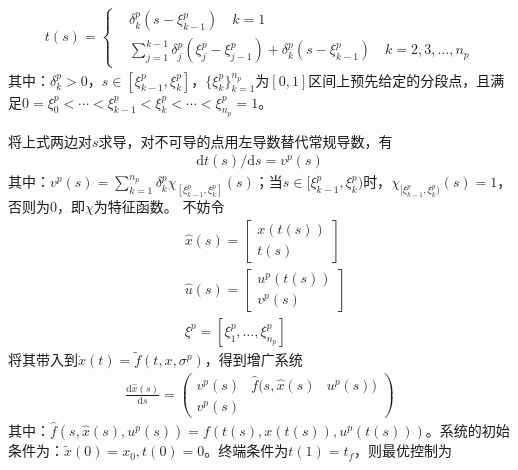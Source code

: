             \begin{align*}
            t(s) = \left\{
            \begin{aligned}
            & \delta_k^p(s-\xi_{k-1}^p)\quad k=1\\
            & \sum_{j=1}^{k-1}\delta_j^p(\xi_j^p - \xi_{j-1}^p)+\delta_k^p(s-\xi_{k-1}^p) \quad k=2,3,\dots,n_p
            \end{aligned}
            \right.
            \end{align*}
            其中：$\delta_k^p >0$，$s\in [\xi_{k-1}^p,\xi_k^p]$，$\{\xi_k^p\}_{k=1}^{n_p}$为$[0,1]$区间上预先给定的分段点，且满足$0=\xi_0^p<\cdots<\xi_{k-1}^p<\xi_k^p<\cdots<\xi_{n_p}^p=1$。
            \par
            将上式两边对$s$求导，对不可导的点用左导数替代常规导数，有
            \begin{align*}
            \mathrm{d}t(s)/\mathrm{d}s = v^p(s)
            \end{align*}
            其中：$v^p(s) = \sum\limits_{k=1}^{n_p}\delta_k^p\chi_{[\xi_{k-1}^p,\xi_k^p]}(s)$；当$s\in [\xi_{k-1}^p,\xi_{k}^p)$时，$\chi_{[\xi_{k-1}^p,\xi_k^p)}(s)=1$，否则为0，即$\chi$为特征函数。
            不妨令
            \begin{align*}
            & \hat{x}(s) = \begin{bmatrix}
            x(t(s))\\
            t(s)
            \end{bmatrix}\\
            & \hat{u}(s) = \begin{bmatrix}
            u^p(t(s))\\
            v^p(s)
            \end{bmatrix}\\
            & \xi^p=[\xi_1^p,\dots,\xi_{n_p}^p]
            \end{align*}
            将其带入到$\dot{x}(t) = \tilde{f}(t,x,\sigma^p)$，得到增广系统
            \begin{align*}
            \frac{\mathrm{d}\hat{x}(s)}{\mathrm{d}s} = \begin{pmatrix}
            v^p(s) & \hat{f}(s,\hat{x}(s)&u^p(s))\\
            v^p(s)
            \end{pmatrix}
            \end{align*}
            其中：$\hat{f}(s,\hat{x}(s),u^p(s)) = f(t(s),x(t(s)),u^p(t(s)))$。系统的初始条件为：$\tilde{x}(0) = x_0,t(0) = 0$。终端条件为$t(1) = t_f$，则最优控制为
